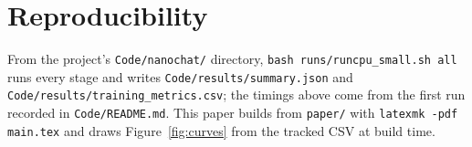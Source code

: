 \documentclass[11pt]{article}
\begin{document}
\section{Reproducibility}

From the project's \texttt{Code/nanochat/} directory, \texttt{bash
runs/runcpu\_small.sh all} runs every stage and writes
\texttt{Code/results/summary.json} and
\texttt{Code/results/training\_metrics.csv}; the timings above come from the
first run recorded in \texttt{Code/README.md}. This paper builds from
\texttt{paper/} with \texttt{latexmk -pdf main.tex} and draws
Figure~\ref{fig:curves} from the tracked CSV at build time.



\end{document}
